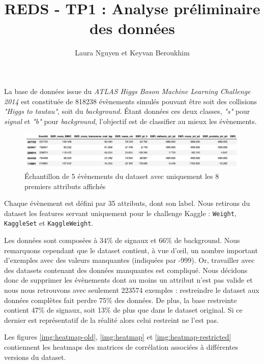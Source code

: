 \documentclass[12pt]{article}
\begin{document}
\title{REDS - TP1 : Analyse préliminaire des données}
\author{Laura Nguyen et Keyvan Beroukhim}
\maketitle

La base de données issue du \emph{ATLAS Higgs Boson Machine Learning Challenge
2014} est constituée de 818238 évènements simulés pouvant être soit des
collisions \emph{"Higgs to tautau"}, soit du \emph{background}. Étant données
ces deux classes, \emph{"s"} pour \emph{signal} et \emph{"b"} pour
\emph{background}, l'objectif est de classifier au mieux les évènements.

\begin{figure}[H]
    \center 
    \includegraphics[width=\textwidth]{images/dataset_sample.png}
    \caption{Échantillon de 5 évènements du dataset avec uniquement les 8
    premiers attributs affichés}
\end{figure}

Chaque évènement est défini par 35 attributs, dont son label. Nous retirons du
dataset les features servant uniquement pour le challenge Kaggle :
\texttt{Weight}, \texttt{KaggleSet} et \texttt{KaggleWeight}.

Les données sont composées à 34\% de signaux et 66\% de background. Nous
remarquons cependant que le dataset contient, à vue d'œil, un nombre important
d'exemples avec des valeurs manquantes (indiquées par -999). Or, travailler avec
des datasets contenant des données manquantes est compliqué. Nous décidons donc
de supprimer les évènements dont au moins un attribut n'est pas valide et nous
nous retrouvons avec seulement 223574 exemples : restreindre le dataset aux
données complètes fait perdre 75\% des données. De plus, la base restreinte
contient 47\% de signaux, soit 13\% de plus que dans le dataset original. Si ce
dernier est représentatif de la réalité alors celui restreint ne l'est pas.

Les figures \ref{img:heatmap-old}, \ref{img:heatmap} et
\ref{img:heatmap-restricted} contiennent les heatmaps des matrices de
corrélation associées à différentes versions du dataset.
\end{document}
